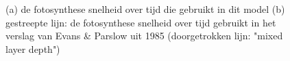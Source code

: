 \begin{figure}[H]
    \centering

    \caption{(a) de fotosynthese snelheid over tijd die gebruikt in dit model (b) gestreepte lijn: de fotosynthese snelheid over tijd gebruikt in het verslag van Evans \& Parslow uit 1985 (doorgetrokken lijn: "mixed layer depth") \cite{Algen1985}
    }
    \label{fig:alphaEvans}
\end{figure}



\newpage




\newpage
